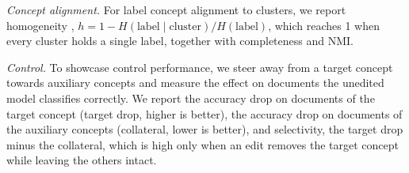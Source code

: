 \documentclass[11pt]{article}
\begin{document}
\emph{Concept alignment.} For label concept alignment to clusters, we report homogeneity \citep{rosenberg2007vmeasure}, $h = 1 - H(\text{label} \mid \text{cluster}) / H(\text{label})$, which reaches 1 when every cluster holds a single label, together with completeness and NMI.

\emph{Control.} To showcase control performance, we steer away from a target concept towards auxiliary concepts and measure the effect on documents the unedited model classifies correctly. We report the accuracy drop on documents of the target concept (target drop, higher is better), the accuracy drop on documents of the auxiliary concepts (collateral, lower is better), and selectivity, the target drop minus the collateral, which is high only when an edit removes the target concept while leaving the others intact.


\end{document}
